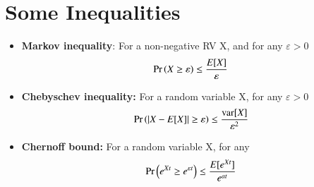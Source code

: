 \documentclass[journal,12pt,twocolumn]{IEEEtran}
\begin{document}
\section{Some Inequalities}
\begin{itemize}
\item  \textbf{Markov inequality}: For a non-negative RV X, and for any $ \varepsilon >0$
\begin{align}
\Pr\left(X \geq \varepsilon \right)\leq \frac{E[X]}{\varepsilon} 
\end{align}
\item  \textbf{Chebyschev inequality:} For a random variable X, for any $\varepsilon >0$
\begin{align}
\Pr\left(|X-E[X]| \geq \varepsilon\right) \leq \frac{\text{var}[X]}{\varepsilon^2}
\end{align}
\item  \textbf{Chernoff bound:} For a random variable X, for any 
\begin{align}
\Pr\left(e^{Xt} \geq e^{\varepsilon t}\right) \leq \frac{E[e^{Xt}]}{e^{at}}
\end{align}
\end{itemize}
%
\end{document}
